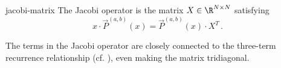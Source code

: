 \begin{remark}{}{jacobi-matrix}
  The Jacobi operator is the matrix \(X \in \R^{N \times N}\) satisfying
  $$x \cdot \vec{P}^{(a,b)}(x) = \vec{P}^{(a,b)}(x) \cdot X^T\,.$$
\end{remark}

The terms in the Jacobi operator are closely connected to the three-term recurrence relationship (cf. ), even making the matrix tridiagonal.
